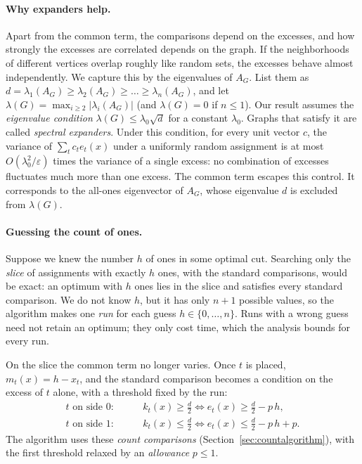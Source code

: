 \documentclass[11pt,a4paper]{article}
\theoremstyle{definition}
\theoremstyle{remark}
\begin{document}
\paragraph{Why expanders help.}
Apart from the common term, the comparisons depend on the excesses, and
how strongly the excesses are correlated depends on the graph. If the
neighborhoods of different vertices overlap roughly like random sets, the
excesses behave almost independently. We capture this by the eigenvalues
of $A_G$. List them as
$d=\lambda_1(A_G)\ge\lambda_2(A_G)\ge\dots\ge\lambda_n(A_G)$, and let
$\lambda(G)=\max_{i\ge2}|\lambda_i(A_G)|$ (and $\lambda(G)=0$ if $n\le1$).
Our result assumes the \emph{eigenvalue condition}
$\lambda(G)\le\lambda_0\sqrt d$ for a constant $\lambda_0$. Graphs that
satisfy it are called \emph{spectral expanders}. Under this condition, for
every unit vector $c$, the variance of $\sum_tc_te_t(x)$ under a uniformly
random assignment is at most $O(\lambda_0^2/\varepsilon)$ times the
variance of a single excess: no combination of excesses fluctuates much
more than one excess. The common term escapes this control. It corresponds
to the all-ones eigenvector of $A_G$, whose eigenvalue $d$ is excluded from
$\lambda(G)$.

\paragraph{Guessing the count of ones.}
Suppose we knew the number $h$ of ones in some optimal cut. Searching only
the \emph{slice} of assignments with exactly $h$ ones, with the standard
comparisons, would be exact: an optimum with $h$ ones lies in the slice
and satisfies every standard comparison. We do not know $h$, but it has
only $n+1$ possible values, so the algorithm makes one \emph{run} for each
guess $h\in\{0,\ldots,n\}$. Runs with a wrong guess need not retain an
optimum; they only cost time, which the analysis bounds for every run.

On the slice the common term no longer varies. Once $t$ is placed,
$m_t(x)=h-x_t$, and the standard comparison becomes a condition on the
excess of $t$ alone, with a threshold fixed by the run:
\begin{align*}
 t\text{ on side }0:&\qquad k_t(x)\ge\tfrac d2
   \iff e_t(x)\ge\tfrac d2-p\,h,\\
 t\text{ on side }1:&\qquad k_t(x)\le\tfrac d2
   \iff e_t(x)\le\tfrac d2-p\,h+p.
\end{align*}
The algorithm uses these \emph{count comparisons}
(Section~\ref{sec:countalgorithm}), with the first threshold relaxed by an
\emph{allowance} $p\le1$.
\end{document}
